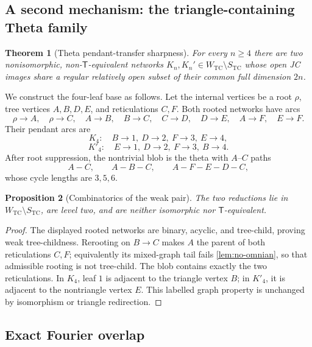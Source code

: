 \documentclass[11pt]{article}
\newtheorem{theorem}{Theorem}[section]
\newtheorem{proposition}[theorem]{Proposition}
\theoremstyle{remark}
\newcommand{\TCw}{W_{\mathrm{TC}}}
\newcommand{\TCs}{S_{\mathrm{TC}}}
\newcommand{\Tmove}{\mathsf T}
\begin{document}
\subsection{A second mechanism: the triangle-containing Theta family}

\begin{theorem}[Theta pendant-transfer sharpness]\label{thm:theta-sharpness}
For every $n\ge4$ there are two nonisomorphic, non-$\Tmove$-equivalent
networks $K_n,K_n'\in\TCw\setminus\TCs$ whose open JC images share a regular
relatively open subset of their common full dimension $2n$.
\end{theorem}

We construct the four-leaf base as follows.  Let the internal vertices be a
root $\rho$, tree
vertices $A,B,D,E$, and reticulations $C,F$.  Both rooted networks have arcs
\begin{equation}\label{eq:weak-arcs}
\rho\to A,\quad \rho\to C,\quad A\to B,\quad B\to C,
\quad C\to D,\quad D\to E,\quad A\to F,\quad E\to F.
\end{equation}
Their pendant arcs are
\[
K_4:\quad B\to1,\ D\to2,\ F\to3,\ E\to4,
\]
\[
K'_4:\quad E\to1,\ D\to2,\ F\to3,\ B\to4.
\]
After root suppression, the nontrivial blob is the theta with $A$--$C$ paths
\[
A-C,\qquad A-B-C,\qquad A-F-E-D-C,
\]
whose cycle lengths are $3,5,6$.



\begin{proposition}[Combinatorics of the weak pair]\label{prop:weak-topology}
The two reductions lie in $\TCw\setminus\TCs$, are level two, and are neither
isomorphic nor $\Tmove$-equivalent.
\end{proposition}

\begin{proof}
The displayed rooted networks are binary, acyclic, and tree-child, proving
weak tree-childness.  Rerooting on $B\to C$ makes $A$ the parent of both
reticulations $C,F$; equivalently its mixed-graph tail fails
\cref{lem:no-omnian}, so that admissible rooting is not tree-child.  The blob
contains exactly the two reticulations.  In $K_4$, leaf $1$ is adjacent to
the triangle vertex $B$; in $K'_4$, it is adjacent to the nontriangle vertex
$E$.  This labelled graph property is unchanged by isomorphism or triangle
redirection.
\end{proof}

\subsection{Exact Fourier overlap}
\end{document}
